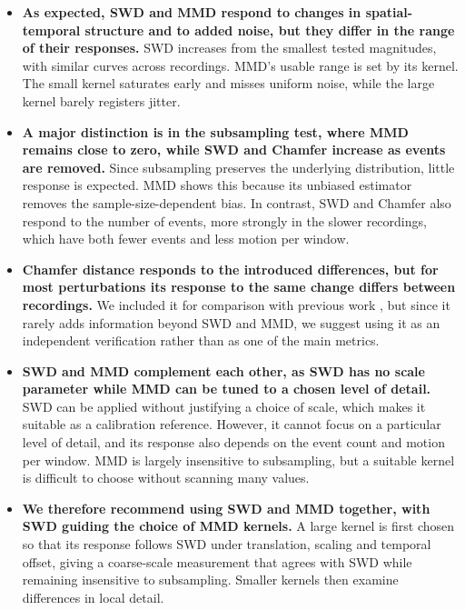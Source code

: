 \begin{itemize}
    \item \textbf{As expected, SWD and MMD respond to changes in spatial-temporal structure and to added noise, but they differ in the range of their responses.} SWD increases from the smallest tested magnitudes, with similar curves across recordings. MMD's usable range is set by its kernel. The small kernel saturates early and misses uniform noise, while the large kernel barely registers jitter.

    \item \textbf{A major distinction is in the subsampling test, where MMD remains close to zero, while SWD and Chamfer increase as events are removed.} Since subsampling preserves the underlying distribution, little response is expected. MMD shows this because its unbiased estimator removes the sample-size-dependent bias. In contrast, SWD and Chamfer also respond to the number of events, more strongly in the slower recordings, which have both fewer events and less motion per window.

    \item \textbf{Chamfer distance responds to the introduced differences, but for most perturbations its response to the same change differs between recordings.} We included it for comparison with previous work \cite{han2024pecs}, but since it rarely adds information beyond SWD and MMD, we suggest using it as an independent verification rather than as one of the main metrics.

    \item \textbf{SWD and MMD complement each other, as SWD has no scale parameter while MMD can be tuned to a chosen level of detail.} SWD can be applied without justifying a choice of scale, which makes it suitable as a calibration reference. However, it cannot focus on a particular level of detail, and its response also depends on the event count and motion per window. MMD is largely insensitive to subsampling, but a suitable kernel is difficult to choose without scanning many values.

    \item \textbf{We therefore recommend using SWD and MMD together, with SWD guiding the choice of MMD kernels.} A large kernel is first chosen so that its response follows SWD under translation, scaling and temporal offset, giving a coarse-scale measurement that agrees with SWD while remaining insensitive to subsampling. Smaller kernels then examine differences in local detail.
\end{itemize}


